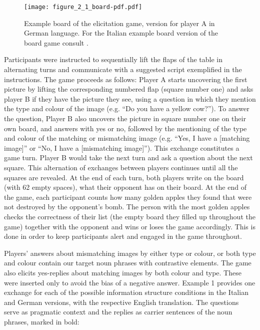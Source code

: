 \begin{figure}
\texttt{[image: figure\_2\_1\_board-pdf.pdf]}
\caption{Example board of the elicitation game, version for player A in German language. For the Italian example board version of the board game consult \citet{SbrannaEtAl2023}.}
\label{fig:2.1}
\end{figure}

Participants were instructed to sequentially lift the flaps of the table in alternating turns and communicate with a suggested script exemplified in the instructions. The game proceeds as follows: Player A starts uncovering the first picture by lifting the corresponding numbered flap (square number one) and asks player B if they have the picture they see, using a question in which they mention the type and colour of the image (e.g. “Do you have a yellow cow?”). To answer the question, Player B also uncovers the picture in square number one on their own board, and answers with yes or no, followed by the mentioning of the type and colour of the matching or mismatching image (e.g. “Yes, I have a [matching image]” or “No, I have a [mismatching image]”). This exchange constitutes a game turn. Player B would take the next turn and ask a question about the next square. This alternation of exchanges between players continues until all the squares are revealed. At the end of each turn, both players write on the board (with 62 empty spaces), what their opponent has on their board. At the end of the game, each participant counts how many golden apples they found that were not destroyed by the opponent’s bomb. The person with the most golden apples checks the correctness of their list (the empty board they filled up throughout the game) together with the opponent and wins or loses the game accordingly. This is done in order to keep participants alert and engaged in the game throughout.

Players’ answers about mismatching images by either type or colour, or both type and colour contain our target noun phrases with contrastive elements. The game also elicits yes-replies about matching images by both colour and type. These were inserted only to avoid the bias of a negative answer. Example 1 provides one exchange for each of the possible information structure conditions in the Italian and German versions, with the respective English translation. The questions serve as pragmatic context and the replies as carrier sentences of the noun phrases, marked in bold:

